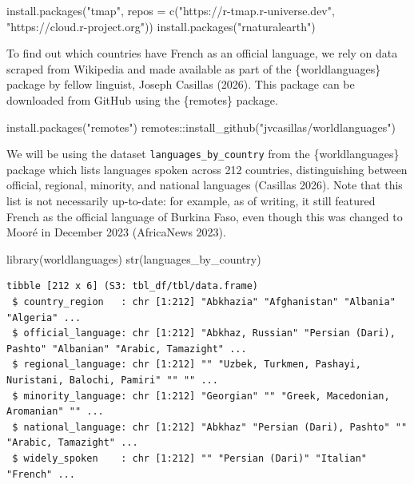 \documentclass[
  letterpaper,
  DIV=11,
  numbers=noendperiod]{scrreprt}
\newenvironment{Shaded}{\begin{snugshade}}{\end{snugshade}}
\newcommand{\AttributeTok}[1]{\textcolor[rgb]{0.40,0.45,0.13}{#1}}
\newcommand{\FunctionTok}[1]{\textcolor[rgb]{0.28,0.35,0.67}{#1}}
\newcommand{\NormalTok}[1]{\textcolor[rgb]{0.00,0.23,0.31}{#1}}
\newcommand{\SpecialCharTok}[1]{\textcolor[rgb]{0.37,0.37,0.37}{#1}}
\newcommand{\StringTok}[1]{\textcolor[rgb]{0.13,0.47,0.30}{#1}}
\begin{document}
\begin{Shaded}
\begin{Highlighting}[]
\FunctionTok{install.packages}\NormalTok{(}\StringTok{"tmap"}\NormalTok{, }\AttributeTok{repos =} \FunctionTok{c}\NormalTok{(}\StringTok{"https://r{-}tmap.r{-}universe.dev"}\NormalTok{,}
                                   \StringTok{"https://cloud.r{-}project.org"}\NormalTok{))}
\FunctionTok{install.packages}\NormalTok{(}\StringTok{"rnaturalearth"}\NormalTok{)}
\end{Highlighting}
\end{Shaded}

To find out which countries have French as an official language, we rely
on data scraped from Wikipedia and made available as part of the
\{worldlanguages\} package by fellow linguist, Joseph Casillas (2026).
This package can be downloaded from GitHub using the \{remotes\}
package.

\begin{Shaded}
\begin{Highlighting}[]
\FunctionTok{install.packages}\NormalTok{(}\StringTok{"remotes"}\NormalTok{)}
\NormalTok{remotes}\SpecialCharTok{::}\FunctionTok{install\_github}\NormalTok{(}\StringTok{"jvcasillas/worldlanguages"}\NormalTok{)}
\end{Highlighting}
\end{Shaded}

We will be using the dataset \texttt{languages\_by\_country} from the
\{worldlanguages\} package which lists languages spoken across 212
countries, distinguishing between official, regional, minority, and
national languages (Casillas 2026). Note that this list is not
necessarily up-to-date: for example, as of writing, it still featured
French as the official language of Burkina Faso, even though this was
changed to Mooré in December 2023 (AfricaNews 2023).

\begin{Shaded}
\begin{Highlighting}[]
\FunctionTok{library}\NormalTok{(worldlanguages)}
\FunctionTok{str}\NormalTok{(languages\_by\_country)}
\end{Highlighting}
\end{Shaded}

\begin{verbatim}
tibble [212 x 6] (S3: tbl_df/tbl/data.frame)
 $ country_region   : chr [1:212] "Abkhazia" "Afghanistan" "Albania" "Algeria" ...
 $ official_language: chr [1:212] "Abkhaz, Russian" "Persian (Dari), Pashto" "Albanian" "Arabic, Tamazight" ...
 $ regional_language: chr [1:212] "" "Uzbek, Turkmen, Pashayi, Nuristani, Balochi, Pamiri" "" "" ...
 $ minority_language: chr [1:212] "Georgian" "" "Greek, Macedonian, Aromanian" "" ...
 $ national_language: chr [1:212] "Abkhaz" "Persian (Dari), Pashto" "" "Arabic, Tamazight" ...
 $ widely_spoken    : chr [1:212] "" "Persian (Dari)" "Italian" "French" ...
\end{verbatim}
\end{document}
